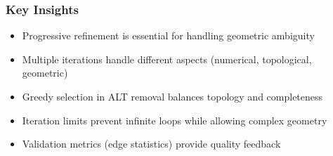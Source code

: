 \subsubsection{Key Insights}

\begin{itemize}
    \item Progressive refinement is essential for handling geometric ambiguity
    \item Multiple iterations handle different aspects (numerical, topological, geometric)
    \item Greedy selection in ALT removal balances topology and completeness
    \item Iteration limits prevent infinite loops while allowing complex geometry
    \item Validation metrics (edge statistics) provide quality feedback
\end{itemize}


